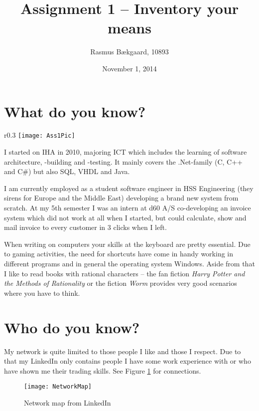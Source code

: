 \documentclass[oneside, 10pt]{article}
\title{Assignment 1 --  Inventory your means}
\author{Rasmus Bækgaard, 10893}
\date{November 1, 2014}
\begin{document}
\maketitle

\section{What do you know?}

\begin{wrapfigure}{r}{0.3\textwidth}
\centering
\texttt{[image: Ass1Pic]}
\end{wrapfigure}



I started on IHA in 2010, majoring ICT which includes the learning of software architecture, -building and -testing.
It mainly covers the .Net-family (C, C++ and C\#) but also SQL, VHDL and Java.

I am currently employed as a student software engineer in HSS Engineering (they sirens for Europe and the Middle East) developing a brand new system from scratch.
At my 5th semester I was an intern at d60 A/S co-developing an invoice system which did not work at all when I started, but could calculate, show and mail invoice to every customer in 3 clicks when I left.

When writing on computers your skills at the keyboard are pretty essential. 
Due to gaming activities, the need for shortcuts have come in handy working in different programs and in general the operating system Windows.
Aside from that I like to read books with rational characters -- the fan fiction \textit{Harry Potter and the Methods of Rationality} or the fiction \textit{Worm} provides very good scenarios where you have to think.


\section{Who do you know?}
My network is quite limited to those people I like and those I respect.
Due to that my LinkedIn only contains people I have some work experience with or who have shown me their trading skills.
See Figure \ref{fig:network} for connections.

\begin{figure}[ht]
\centering
\texttt{[image: NetworkMap]}
\caption{Network map from LinkedIn}
\label{fig:network}
\end{figure}
\end{document}
